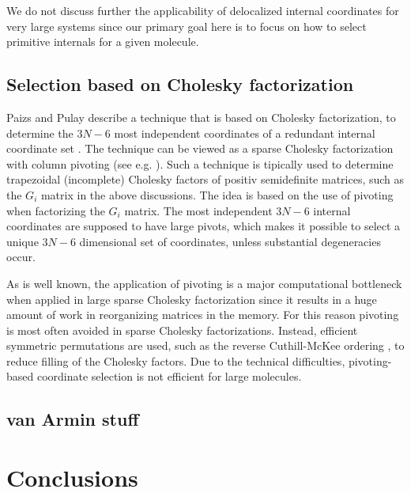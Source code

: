 \documentclass[prl,aps,preprint,superbib,12pt]{revtex4}
\begin{document}
We do not discuss further the applicability of delocalized internal 
coordinates for very large systems since our primary goal here is 
to focus on how to select primitive internals for a given molecule.

\subsection{Selection based on Cholesky factorization}
Paizs and Pulay describe a technique that is based
on Cholesky factorization, to determine the $3N-6$ most independent
coordinates of a redundant internal coordinate set \cite{BPaizs00}.
The technique can be viewed as a sparse Cholesky factorization
with column pivoting (see e.g. \cite{GGolub96}). Such a technique
is tipically used to determine trapezoidal (incomplete) Cholesky
factors of positiv semidefinite matrices, such as the $G_{i}$ matrix
in the above discussions. The idea is based on the use of
pivoting when factorizing the $G_{i}$ matrix. The most independent
$3N-6$ internal coordinates are supposed to have large pivots, 
which makes it possible to select a unique $3N-6$ dimensional
set of coordinates, unless substantial degeneracies occur.

As is well known, the application of pivoting
is a major computational bottleneck when applied in large sparse 
Cholesky factorization \cite{AGeorge81} 
since it results in a huge amount of work
in reorganizing matrices in the memory. For this reason pivoting is 
most often avoided in sparse Cholesky factorizations. Instead,
efficient symmetric permutations are used, such as the
reverse Cuthill-McKee ordering \cite{AGeorge81}, to reduce filling
of the Cholesky factors. Due to the technical difficulties,
pivoting-based coordinate selection is not efficient for large 
molecules.

\subsection{van Armin stuff}



\section{Conclusions} \label{Conclusions}


\end{document}
